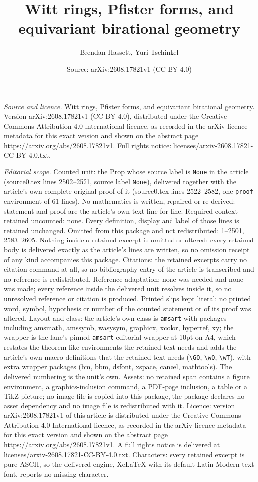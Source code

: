 \documentclass[10pt,a4paper]{amsart}
\title[Witt rings, Pfister forms, and equivariant birational geomet]{Witt rings, Pfister forms, and equivariant birational geometry}
\author{Brendan Hassett, Yuri Tschinkel}
\date{Source: arXiv:2608.17821v1 (CC BY 4.0)}
\begin{document}
\maketitle

\noindent\emph{Source and licence.} Witt rings, Pfister forms, and equivariant birational geometry. Version arXiv:2608.17821v1 (CC BY 4.0), distributed under the Creative Commons Attribution 4.0 International licence, as recorded in the arXiv licence metadata for this exact version and shown on the abstract page https://arxiv.org/abs/2608.17821v1. Full rights notice: licenses/arxiv-2608.17821-CC-BY-4.0.txt.\par\smallskip

\noindent\textit{Editorial scope.} Counted unit: the Prop whose source label is \texttt{None} in the article (source0.tex lines 2502--2521, source label \texttt{None}), delivered together with the article's own complete original proof of it (source0.tex lines 2522--2582, one \texttt{proof} environment of 61 lines). No mathematics is written, repaired or re-derived: statement and proof are the article's own text line for line. Required context retained uncounted: none. Every definition, display and label of those lines is retained unchanged. Omitted from this package and not redistributed: 1--2501, 2583--2605. Nothing inside a retained excerpt is omitted or altered: every retained body is delivered exactly as the article's lines are written, so no omission receipt of any kind accompanies this package. Citations: the retained excerpts carry no citation command at all, so no bibliography entry of the article is transcribed and no reference is redistributed. Reference adaptation: none was needed and none was made; every reference inside the delivered unit resolves inside it, so no unresolved reference or citation is produced. Printed slips kept literal: no printed word, symbol, hypothesis or number of the counted statement or of its proof was altered. Layout and class: the article's own class is \texttt{amsart} with packages including amsmath, amssymb, wasysym, graphicx, xcolor, hyperref, xy; the wrapper is the lane's pinned \texttt{amsart} editorial wrapper at 10pt on A4, which restates the theorem-like environments the retained text needs and adds the article's own macro definitions that the retained text needs (\texttt{\textbackslash GO}, \texttt{\textbackslash wQ}, \texttt{\textbackslash wT}), with extra wrapper packages (bm, bbm, dsfont, xspace, cancel, mathtools). The delivered numbering is the unit's own. Assets: no retained span contains a figure environment, a graphics-inclusion command, a PDF-page inclusion, a table or a TikZ picture; no image file is copied into this package, the package declares no asset dependency and no image file is redistributed with it. Licence: version arXiv:2608.17821v1 of this article is distributed under the Creative Commons Attribution 4.0 International licence, as recorded in the arXiv licence metadata for this exact version and shown on the abstract page https://arxiv.org/abs/2608.17821v1. A full rights notice is delivered at licenses/arxiv-2608.17821-CC-BY-4.0.txt. Characters: every retained excerpt is pure ASCII, so the delivered engine, XeLaTeX with its default Latin Modern text font, reports no missing character.
\end{document}
